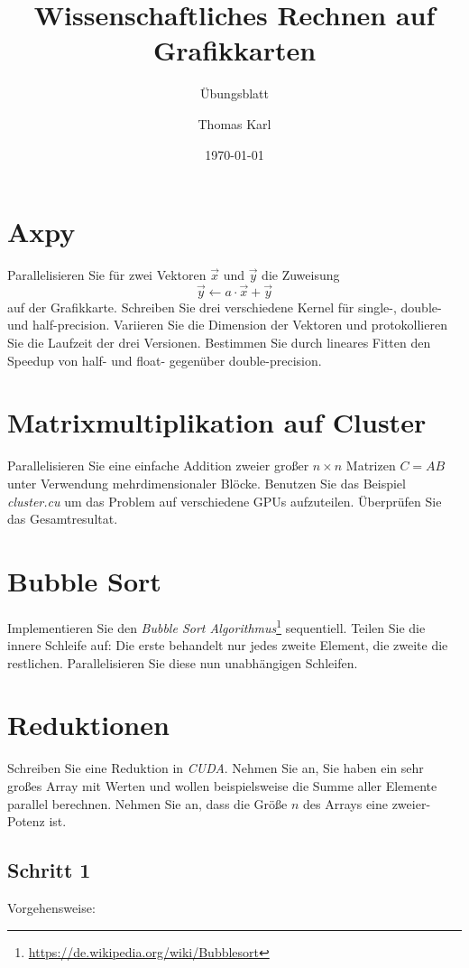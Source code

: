 \documentclass[headsepline=3pt,headinclude=true,12pt,oneside]{scrartcl}
\author{Thomas Karl}
\title{Wissenschaftliches Rechnen auf Grafikkarten}
\subtitle{Übungsblatt}
\date{\today}
\begin{document}
	\maketitle
	
	\section{Axpy}
	Parallelisieren Sie für zwei Vektoren $\vec{x}$ und $\vec{y}$ die Zuweisung
	\begin{equation}
	\vec{y} \leftarrow a\cdot\vec{x} + \vec{y} 
	\end{equation}
	auf der Grafikkarte. Schreiben Sie drei verschiedene Kernel für single-, double- und half-precision. Variieren Sie die Dimension der Vektoren und protokollieren Sie die Laufzeit der drei Versionen. Bestimmen Sie durch lineares Fitten den Speedup von half- und float- gegenüber double-precision.
	
	\section{Matrixmultiplikation auf Cluster}
	Parallelisieren Sie eine einfache Addition zweier großer $n\times n$ Matrizen $C = AB$ unter Verwendung mehrdimensionaler Blöcke. Benutzen Sie das Beispiel \textit{cluster.cu} um das Problem auf verschiedene GPUs aufzuteilen. Überprüfen Sie das Gesamtresultat.
	
	\section{Bubble Sort}
	Implementieren Sie den \textit{Bubble Sort Algorithmus}\footnote{\url{https://de.wikipedia.org/wiki/Bubblesort}} sequentiell. Teilen Sie die innere Schleife auf: Die erste behandelt nur jedes zweite Element, die zweite die restlichen. Parallelisieren Sie diese nun unabhängigen Schleifen.
	
	\section{Reduktionen}
	Schreiben Sie eine Reduktion in \textit{CUDA}. Nehmen Sie an, Sie haben ein sehr großes Array mit Werten und wollen beispielsweise die Summe aller Elemente parallel berechnen. Nehmen Sie an, dass die Größe $n$ des Arrays eine zweier-Potenz ist.
		
		\subsection{Schritt 1}
		Vorgehensweise:
		
\end{document}
